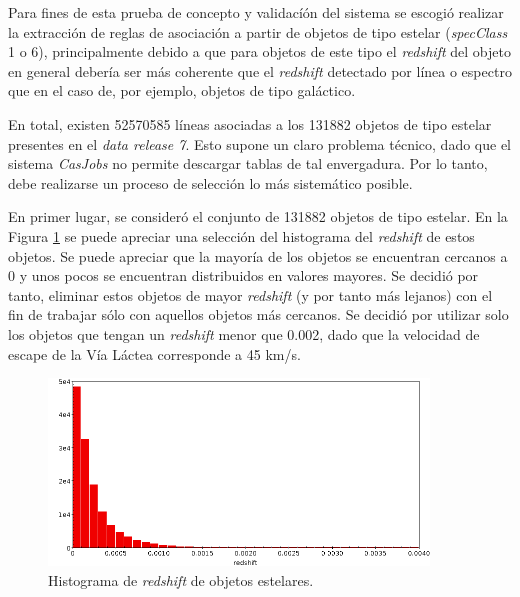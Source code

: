 Para fines de esta prueba de concepto y validacíón del sistema se escogió realizar la extracción de reglas de asociación a partir de objetos de tipo estelar (\textit{specClass} 1 o 6), principalmente debido a que para objetos de este tipo el \textit{redshift} del objeto en general debería ser más coherente que el \textit{redshift} detectado por línea o espectro que en el caso de, por ejemplo, objetos de tipo galáctico.

En total, existen 52570585 líneas asociadas a los 131882 objetos de tipo estelar presentes en el \textit{data release 7}. Esto supone un claro problema técnico, dado que el sistema \textit{CasJobs} no permite descargar tablas de tal envergadura. Por lo tanto, debe realizarse un proceso de selección lo más sistemático posible. 

En primer lugar, se consideró el conjunto de 131882 objetos de tipo estelar. En la Figura \ref{fig:stelar_obj_redshift} se puede apreciar una selección del histograma del \textit{redshift} de estos objetos. Se puede apreciar que la mayoría de los objetos se encuentran cercanos a 0 y unos pocos se encuentran distribuidos en valores mayores. Se decidió por tanto, eliminar estos objetos de mayor \textit{redshift} (y por tanto más lejanos) con el fin de trabajar sólo con aquellos objetos más cercanos. Se decidió por utilizar solo los objetos que tengan un \textit{redshift} menor que 0.002, dado que la velocidad de escape de la Vía Láctea corresponde a 45 km/s.

\begin{figure}[h!]
\begin{center}
\includegraphics[width=0.9\textwidth]{imagenes/stelar_obj_redshift_hist.png}
\end{center}
\vspace*{-5mm}
\caption{Histograma de \textit{redshift} de objetos estelares.}
\label{fig:stelar_obj_redshift}
\end{figure}

